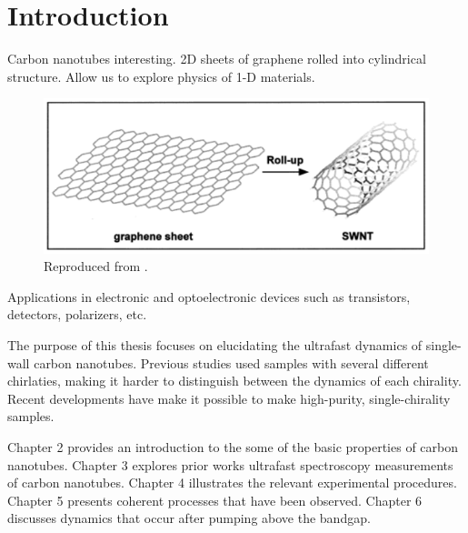 \chapter{Introduction}

Carbon nanotubes interesting. 2D sheets of graphene rolled into cylindrical structure. Allow us to explore physics of 1-D materials. 

\begin{figure}[H]
	\centering
	\includegraphics{images/chapter_intro/rolled_up_graphene.png}
	\caption{ Reproduced from \cite{odom2000structure}.}
\end{figure}

Applications in electronic and optoelectronic devices such as transistors, detectors, polarizers, etc. 

The purpose of this thesis focuses on elucidating the ultrafast dynamics of single-wall carbon nanotubes. Previous studies used samples with several different chirlaties, making it harder to distinguish between the dynamics of each chirality. Recent developments have make it possible to make high-purity, single-chirality samples. 

Chapter 2 provides an introduction to the some of the basic properties of carbon nanotubes. Chapter 3 explores prior works ultrafast spectroscopy measurements of carbon nanotubes. Chapter 4 illustrates the relevant experimental procedures. Chapter 5 presents coherent processes that have been observed. Chapter 6 discusses dynamics that occur after pumping above the bandgap.